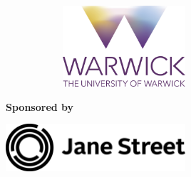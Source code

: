 \documentclass{article}
\begin{document}
\begin{titlepage}
\begin{center}
\begin{figure}[h]
\begin{subfigure}{0.5\textwidth}
            \end{subfigure}
            \begin{subfigure}{0.5\textwidth}
                 \includegraphics[width=0.5\textwidth]{University_of_Warwick_logo_2015_with_descriptor.png}  
            \end{subfigure}%
        \end{figure}
         
       
            

       \vfill
        \Large
       \textbf{Sponsored by}
            
       \vspace{0.8cm}
        
        \includegraphics[width=0.5\textwidth]{Jane Street logo.jpg}
       
            
       
            
   \end{center}
\end{titlepage}







\end{document}
